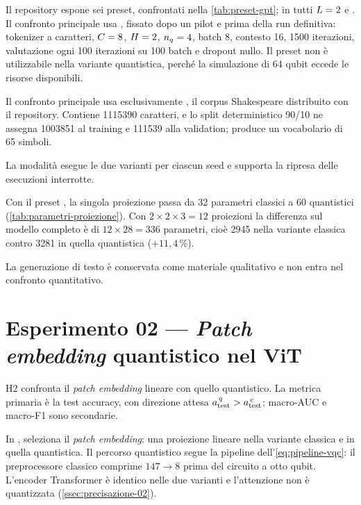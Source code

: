 Il repository espone sei preset, confrontati nella \cref{tab:preset-gpt}; in tutti
$L = 2$ e . Il confronto principale usa
, fissato dopo un pilot e prima della run definitiva: tokenizer
a caratteri, $C = 8$, $H = 2$, $n_q = 4$, batch 8, contesto 16, 1500
iterazioni, valutazione ogni 100 iterazioni su 100 batch e dropout nullo. Il
preset  non è utilizzabile nella variante quantistica, perché la
simulazione di 64 qubit eccede le risorse disponibili.

Il confronto principale usa esclusivamente , il corpus
Shakespeare distribuito con il repository. Contiene \num{1115390} caratteri, e lo
split deterministico 90/10 ne assegna \num{1003851} al training e \num{111539}
alla validation;  produce un vocabolario di 65 simboli.

La modalità  esegue le due varianti per ciascun seed e supporta la
ripresa delle esecuzioni interrotte.

Con il preset , la singola proiezione passa da 32
parametri classici a 60 quantistici (\cref{tab:parametri-proiezione}). Con
$2\times2\times3 = 12$ proiezioni la differenza sul modello completo è di
$12\times28=\num{336}$ parametri, cioè \num{2945} nella variante classica contro
\num{3281} in quella quantistica ($+11{,}4\,\%$).

La generazione di testo è conservata come materiale qualitativo e non entra nel
confronto quantitativo.

\section{Esperimento 02 --- \emph{Patch embedding} quantistico nel ViT}
\label{sec:esp-vit}

H2 confronta il \emph{patch embedding} lineare con quello quantistico. La metrica
primaria è la test accuracy, con direzione attesa
$a_{\mathrm{test}}^{\,q}>a_{\mathrm{test}}^{\,c}$; macro-AUC e macro-F1 sono secondarie.

In ,  seleziona il \emph{patch
embedding}: una proiezione lineare nella variante classica e
 in quella quantistica. Il percorso quantistico
segue la pipeline dell'\cref{eq:pipeline-vqc}: il preprocessore classico comprime
$147 \to 8$ prima del circuito a otto qubit. L'encoder Transformer è identico
nelle due varianti e l'attenzione non è quantizzata
(\cref{ssec:precisazione-02}).

